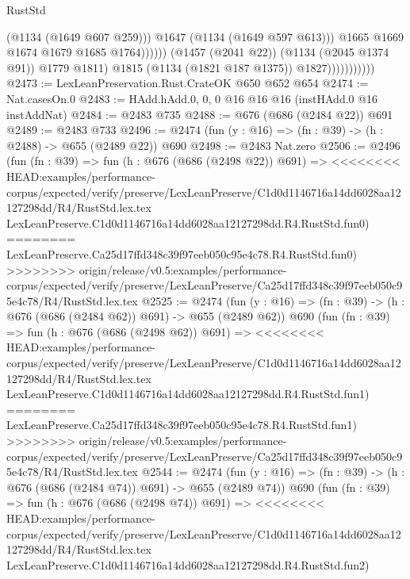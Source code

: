 \begin{lexlean}{RustStd}
\begin{coremodule}
{\begin{coremodule}
{{{{{{{                                            (@1134 (@1649 @607 @259)))
                                          @1647
                                          (@1134 (@1649 @597 @613)))
                                        @1665
                                        @1669
                                        @1674
                                        @1679
                                        @1685
                                        @1764))))))
                            (@1457 (@2041 @22))
                            (@1134 (@2045 @1374 @91))
                            @1779
                            @1811)
                          @1815
                          (@1134 (@1821 @187 @1375))
                          @1827)))))))))))
@2473 := LexLeanPreservation.Rust.CrateOK @650 @652 @654
@2474 := Nat.casesOn.{0}
@2483 := HAdd.hAdd.{0, 0, 0} @16 @16 @16 (instHAdd.{0} @16 instAddNat)
@2484 := @2483 @735
@2488 := @676 (@686 (@2484 @22)) @691
@2489 := @2483 @733
@2496 := @2474 (fun (y : @16) => (fn : @39) -> (h : @2488) -> @655 (@2489 @22)) @690
@2498 := @2483 Nat.zero
@2506 := @2496
    (fun (fn : @39) =>
    fun (h : @676 (@686 (@2498 @22)) @691) =>
<<<<<<<< HEAD:examples/performance-corpus/expected/verify/preserve/LexLeanPreserve/C1d0d1146716a14dd6028aa12127298dd/R4/RustStd.lex.tex
    LexLeanPreserve.C1d0d1146716a14dd6028aa12127298dd.R4.RustStd.fun0)
========
    LexLeanPreserve.Ca25d17ffd348c39f97eeb050c95e4c78.R4.RustStd.fun0)
>>>>>>>> origin/release/v0.5:examples/performance-corpus/expected/verify/preserve/LexLeanPreserve/Ca25d17ffd348c39f97eeb050c95e4c78/R4/RustStd.lex.tex
@2525 := @2474
    (fun (y : @16) => (fn : @39) -> (h : @676 (@686 (@2484 @62)) @691) -> @655 (@2489 @62))
    @690
    (fun (fn : @39) =>
    fun (h : @676 (@686 (@2498 @62)) @691) =>
<<<<<<<< HEAD:examples/performance-corpus/expected/verify/preserve/LexLeanPreserve/C1d0d1146716a14dd6028aa12127298dd/R4/RustStd.lex.tex
    LexLeanPreserve.C1d0d1146716a14dd6028aa12127298dd.R4.RustStd.fun1)
========
    LexLeanPreserve.Ca25d17ffd348c39f97eeb050c95e4c78.R4.RustStd.fun1)
>>>>>>>> origin/release/v0.5:examples/performance-corpus/expected/verify/preserve/LexLeanPreserve/Ca25d17ffd348c39f97eeb050c95e4c78/R4/RustStd.lex.tex
@2544 := @2474
    (fun (y : @16) => (fn : @39) -> (h : @676 (@686 (@2484 @74)) @691) -> @655 (@2489 @74))
    @690
    (fun (fn : @39) =>
    fun (h : @676 (@686 (@2498 @74)) @691) =>
<<<<<<<< HEAD:examples/performance-corpus/expected/verify/preserve/LexLeanPreserve/C1d0d1146716a14dd6028aa12127298dd/R4/RustStd.lex.tex
    LexLeanPreserve.C1d0d1146716a14dd6028aa12127298dd.R4.RustStd.fun2)
}}}}}}}
\end{coremodule}}
\end{coremodule}
\end{lexlean}
